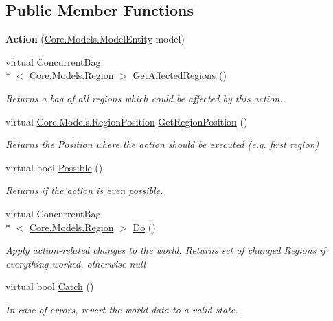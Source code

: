 \subsection*{Public Member Functions}
\begin{DoxyCompactItemize}
\item 
\hypertarget{classCore_1_1Controllers_1_1Actions_1_1Action_abb5103ff9280d2556e57a0fdaf090fe1}{{\bfseries Action} (\hyperlink{classCore_1_1Models_1_1ModelEntity}{Core.\-Models.\-Model\-Entity} model)}\label{classCore_1_1Controllers_1_1Actions_1_1Action_abb5103ff9280d2556e57a0fdaf090fe1}

\item 
virtual Concurrent\-Bag\\*
$<$ \hyperlink{classCore_1_1Models_1_1Region}{Core.\-Models.\-Region} $>$ \hyperlink{classCore_1_1Controllers_1_1Actions_1_1Action_aa11bdeffff43ec47ac7c3d6843a85674}{Get\-Affected\-Regions} ()
\begin{DoxyCompactList}\small\item\em Returns a bag of all regions which could be affected by this action. \end{DoxyCompactList}\item 
virtual \hyperlink{classCore_1_1Models_1_1RegionPosition}{Core.\-Models.\-Region\-Position} \hyperlink{classCore_1_1Controllers_1_1Actions_1_1Action_a6ffe3c30cb5648a81f50096f4f332d5a}{Get\-Region\-Position} ()
\begin{DoxyCompactList}\small\item\em Returns the Position where the action should be executed (e.\-g. first region) \end{DoxyCompactList}\item 
virtual bool \hyperlink{classCore_1_1Controllers_1_1Actions_1_1Action_a405b995343a9394ad19e05a699a4e6d9}{Possible} ()
\begin{DoxyCompactList}\small\item\em Returns if the action is even possible. \end{DoxyCompactList}\item 
virtual Concurrent\-Bag\\*
$<$ \hyperlink{classCore_1_1Models_1_1Region}{Core.\-Models.\-Region} $>$ \hyperlink{classCore_1_1Controllers_1_1Actions_1_1Action_afbb091ee28eee896951fac600188d446}{Do} ()
\begin{DoxyCompactList}\small\item\em Apply action-\/related changes to the world. Returns set of changed Regions if everything worked, otherwise null \end{DoxyCompactList}\item 
virtual bool \hyperlink{classCore_1_1Controllers_1_1Actions_1_1Action_ada4c77dfeee78ded10a6eb6a506defb4}{Catch} ()
\begin{DoxyCompactList}\small\item\em In case of errors, revert the world data to a valid state. \end{DoxyCompactList}\end{DoxyCompactItemize}
